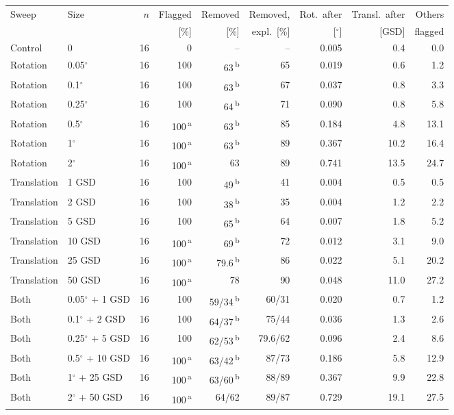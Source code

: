 \begin{tabular}{llrrrrrrr}
\toprule
Sweep & Size & $n$ & Flagged & Removed & Removed, & Rot.\ after & Transl.\ after & Others \\
 & & & [\%] & [\%] & expl.\ [\%] & [$^{\circ}$] & [GSD] & flagged \\
\midrule
Control & 0 & 16 & 0 & -- & -- & 0.005 & 0.4 & 0.0 \\
\midrule
Rotation & 0.05$^{\circ}$ & 16 & 100 & 63\,\textsuperscript{b} & 65 & 0.019 & 0.6 & 1.2 \\
Rotation & 0.1$^{\circ}$ & 16 & 100 & 63\,\textsuperscript{b} & 67 & 0.037 & 0.8 & 3.3 \\
Rotation & 0.25$^{\circ}$ & 16 & 100 & 64\,\textsuperscript{b} & 71 & 0.090 & 0.8 & 5.8 \\
Rotation & 0.5$^{\circ}$ & 16 & 100\,\textsuperscript{a} & 63\,\textsuperscript{b} & 85 & 0.184 & 4.8 & 13.1 \\
Rotation & 1$^{\circ}$ & 16 & 100\,\textsuperscript{a} & 63\,\textsuperscript{b} & 89 & 0.367 & 10.2 & 16.4 \\
Rotation & 2$^{\circ}$ & 16 & 100\,\textsuperscript{a} & 63 & 89 & 0.741 & 13.5 & 24.7 \\
\midrule
Translation & 1 GSD & 16 & 100 & 49\,\textsuperscript{b} & 41 & 0.004 & 0.5 & 0.5 \\
Translation & 2 GSD & 16 & 100 & 38\,\textsuperscript{b} & 35 & 0.004 & 1.2 & 2.2 \\
Translation & 5 GSD & 16 & 100 & 65\,\textsuperscript{b} & 64 & 0.007 & 1.8 & 5.2 \\
Translation & 10 GSD & 16 & 100\,\textsuperscript{a} & 69\,\textsuperscript{b} & 72 & 0.012 & 3.1 & 9.0 \\
Translation & 25 GSD & 16 & 100\,\textsuperscript{a} & 79.6\,\textsuperscript{b} & 86 & 0.022 & 5.1 & 20.2 \\
Translation & 50 GSD & 16 & 100\,\textsuperscript{a} & 78 & 90 & 0.048 & 11.0 & 27.2 \\
\midrule
Both & 0.05$^{\circ}$ + 1 GSD & 16 & 100 & 59/34\,\textsuperscript{b} & 60/31 & 0.020 & 0.7 & 1.2 \\
Both & 0.1$^{\circ}$ + 2 GSD & 16 & 100 & 64/37\,\textsuperscript{b} & 75/44 & 0.036 & 1.3 & 2.6 \\
Both & 0.25$^{\circ}$ + 5 GSD & 16 & 100 & 62/53\,\textsuperscript{b} & 79.6/62 & 0.096 & 2.4 & 8.6 \\
Both & 0.5$^{\circ}$ + 10 GSD & 16 & 100\,\textsuperscript{a} & 63/42\,\textsuperscript{b} & 87/73 & 0.186 & 5.8 & 12.9 \\
Both & 1$^{\circ}$ + 25 GSD & 16 & 100\,\textsuperscript{a} & 63/60\,\textsuperscript{b} & 88/89 & 0.367 & 9.9 & 22.8 \\
Both & 2$^{\circ}$ + 50 GSD & 16 & 100\,\textsuperscript{a} & 64/62 & 89/87 & 0.729 & 19.1 & 27.5 \\
\bottomrule
\end{tabular}
